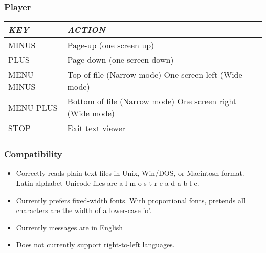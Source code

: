 \subsubsection{Player}

\begin{tabular}[c]{|p{3.291cm}|p{7.131cm}|}
\hline
{\centering\bfseries\itshape
KEY
\par}
&
{\centering\bfseries\itshape
ACTION
\par}
\\\hline
{\centering
MINUS
\par}
&
Page{}-up (one screen up)
\\\hline
{\centering
PLUS
\par}
&
Page{}-down (one screen down)
\\\hline
{\centering
MENU MINUS
\par}
&
Top of file (Narrow mode)\newline
One screen left (Wide mode)
\\\hline
{\centering
MENU PLUS
\par}
&
Bottom of file (Narrow mode)\newline
One screen right (Wide mode)
\\\hline
{\centering
STOP
\par}
&
Exit text viewer
\\\hline
\end{tabular}

\subsubsection{Compatibility}

\begin{itemize}
\item Correctly reads plain text files in Unix, Win/DOS, or Macintosh
format. Latin{}-alphabet Unicode files are  a l m o s t  r e a d a b l
e.
\item Currently prefers fixed{}-width fonts. With proportional fonts,
pretends all characters are the width of a lower{}-case 'o'.
\item Currently messages are in English 
\item Does not currently support right{}-to{}-left languages.
\end{itemize}


